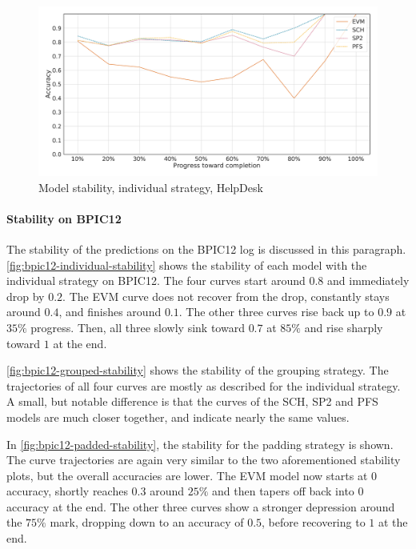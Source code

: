 \begin{figure}[!htb]
    \centering
    \includegraphics[width=\textwidth]{gfx/helpdesk/individual_stability.pdf}
    \caption{Model stability, individual strategy, HelpDesk}
    \label{fig:helpdesk-individual-stability}
\end{figure}

\paragraph{Stability on BPIC12}
The stability of the predictions on the BPIC12 log is discussed in this paragraph.
\autoref{fig:bpic12-individual-stability} shows the stability of each model with the individual strategy on BPIC12.
The four curves start around $0.8$ and immediately drop by $0.2$.
The EVM curve does not recover from the drop, constantly stays around $0.4$, and finishes around $0.1$.
The other three curves rise back up to $0.9$ at $35\%$ progress.
Then, all three slowly sink toward $0.7$ at $85\%$ and rise sharply toward $1$ at the end.

\autoref{fig:bpic12-grouped-stability} shows the stability of the grouping strategy.
The trajectories of all four curves are mostly as described for the individual strategy.
A small, but notable difference is that the curves of the SCH, SP2 and PFS models are much closer together, and indicate nearly the same values.

In \autoref{fig:bpic12-padded-stability}, the stability for the padding strategy is shown.
The curve trajectories are again very similar to the two aforementioned stability plots, but the overall accuracies are lower.
The EVM model now starts at $0$ accuracy, shortly reaches $0.3$ around $25\%$ and then tapers off back into $0$ accuracy at the end.
The other three curves show a stronger depression around the $75\%$ mark, dropping down to an accuracy of $0.5$, before recovering to $1$ at the end.

